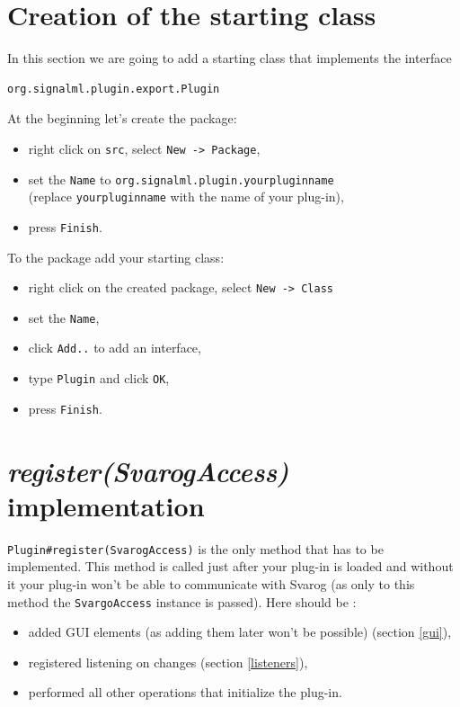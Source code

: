\documentclass{article}
\begin{document}
\section{Creation of the starting class}
\label{starting-class}
In this section we are going to add a starting class that implements the interface
\begin{verbatim}org.signalml.plugin.export.Plugin \end{verbatim}
At the beginning let's create the package:
\begin{itemize}
	\item right click on \verb=src=, select \verb=New -> Package=,
	\item set the \verb=Name= to \verb=org.signalml.plugin.yourpluginname=\\
		(replace \verb=yourpluginname= with the name of your plug-in),
	\item press \verb=Finish=.
\end{itemize}
To the package add your starting class:
\begin{itemize}
	\item right click on the created package, select \verb=New -> Class=
	\item set the \verb=Name=,
	\item click \verb=Add..= to add an interface,
	\item type \verb=Plugin= and click \verb=OK=,
	\item press \verb=Finish=.
\end{itemize}

\section{\textit{register(SvarogAccess)} implementation}
\label{register}

\verb=Plugin#register(SvarogAccess)= is the only method that has to be implemented.
This method is called just after your plug-in is loaded and without it your plug-in won't
be able to communicate with Svarog (as only to this method the \verb=SvargoAccess= instance is passed).
Here should be :
\begin{itemize}
	\item added GUI elements (as adding them later won't be possible) (section \ref{gui}),
	\item registered listening on changes (section \ref{listeners}),
	\item performed all other operations that initialize the plug-in.
\end{itemize}
\end{document}
